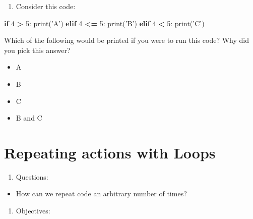 \documentclass[]{book}
\newenvironment{Shaded}{\begin{snugshade}}{\end{snugshade}}
\newcommand{\BuiltInTok}[1]{#1}
\newcommand{\ControlFlowTok}[1]{\textcolor[rgb]{0.13,0.29,0.53}{\textbf{#1}}}
\newcommand{\DecValTok}[1]{\textcolor[rgb]{0.00,0.00,0.81}{#1}}
\newcommand{\NormalTok}[1]{#1}
\newcommand{\OperatorTok}[1]{\textcolor[rgb]{0.81,0.36,0.00}{\textbf{#1}}}
\newcommand{\StringTok}[1]{\textcolor[rgb]{0.31,0.60,0.02}{#1}}
\providecommand{\tightlist}{%
  \setlength{\itemsep}{0pt}\setlength{\parskip}{0pt}}
\theoremstyle{definition}
\theoremstyle{definition}
\theoremstyle{definition}
\theoremstyle{remark}
\begin{document}
\begin{enumerate}
\def\labelenumi{\arabic{enumi}.}
\setcounter{enumi}{2}
\tightlist
\item
  Consider this code:
\end{enumerate}

\begin{Shaded}
\begin{Highlighting}[]
\ControlFlowTok{if} \DecValTok{4} \OperatorTok{>} \DecValTok{5}\NormalTok{:}
    \BuiltInTok{print}\NormalTok{(}\StringTok{'A'}\NormalTok{)}
\ControlFlowTok{elif} \DecValTok{4} \OperatorTok{<=} \DecValTok{5}\NormalTok{:}
    \BuiltInTok{print}\NormalTok{(}\StringTok{'B'}\NormalTok{)}
\ControlFlowTok{elif} \DecValTok{4} \OperatorTok{<} \DecValTok{5}\NormalTok{:}
    \BuiltInTok{print}\NormalTok{(}\StringTok{'C'}\NormalTok{)}
\end{Highlighting}
\end{Shaded}

Which of the following would be printed if you were to run this code?
Why did you pick this answer?

\begin{itemize}
\tightlist
\item
  A
\item
  B
\item
  C
\item
  B and C
\end{itemize}

\hypertarget{repeating-actions-with-loops}{%
\chapter{Repeating actions with
Loops}\label{repeating-actions-with-loops}}

\begin{enumerate}
\def\labelenumi{\arabic{enumi}.}
\tightlist
\item
  Questions:
\end{enumerate}

\begin{itemize}
\tightlist
\item
  How can we repeat code an arbitrary number of times?
\end{itemize}

\begin{enumerate}
\def\labelenumi{\arabic{enumi}.}
\setcounter{enumi}{1}
\tightlist
\item
  Objectives:
\end{enumerate}
\end{document}
